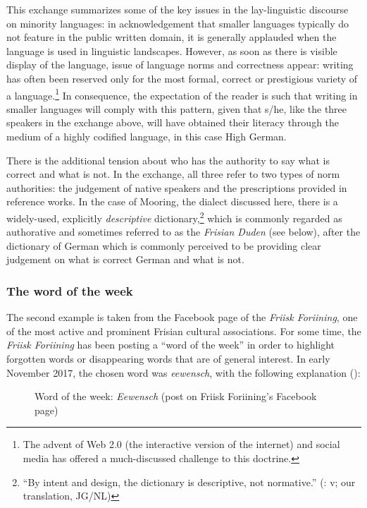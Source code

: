 \documentclass[output=paper]{langsci/langscibook}
\begin{document}
This exchange summarizes some of the key issues in the lay-linguistic discourse on minority languages: in acknowledgement that smaller languages typically do not feature in the public written domain, it is generally applauded when the language is used in linguistic landscapes. However, as soon as there is visible display of the language, issue of language norms and correctness appear: writing has often been reserved only for the most formal, correct or prestigious variety of a language.\footnote{The advent of Web 2.0 (the interactive version of the internet) and social media has offered a much-discussed challenge to this doctrine.} In consequence, the expectation of the reader is such that writing in smaller languages will comply with this pattern, given that s/he, like the three speakers in the exchange above, will have obtained their literacy through the medium of a highly codified language, in this case High German.\par There is the additional tension about who has the authority to say what is correct and what is not. In the exchange, all three refer to two types of norm authorities: the judgement of native speakers and the prescriptions provided in reference works. In the case of Mooring, the dialect discussed here, there is a widely-used, explicitly \textit{descriptive} dictionary,\footnote{“By intent and design, the dictionary is descriptive, not normative.” (\citealt{SjolinEtAl1988}: v; our translation, JG/NL)} which is commonly regarded as authorative and sometimes referred to as the \textit{Frisian Duden} (see  below), after the dictionary of German which is commonly perceived to be providing clear judgement on what is correct German and what is not. 


\subsubsection{The word of the week}
\label{sec:gregersen:5.3.2}

The second example is taken from the Facebook page of the \textit{Friisk Foriining}, one of the most active and prominent Frisian cultural associations. For some time, the \textit{Friisk Foriining} has been posting a “word of the week” in order to highlight forgotten words or disappearing words that are of general interest. In early November 2017, the chosen word was \textit{eewensch}, with the following explanation ():

 \begin{figure}
 \caption{Word of the week: \textit{Eewensch} (post on Friisk Foriining’s Facebook page)}\label{fig:gregersen:3}
 \end{figure}
 
\end{document}
